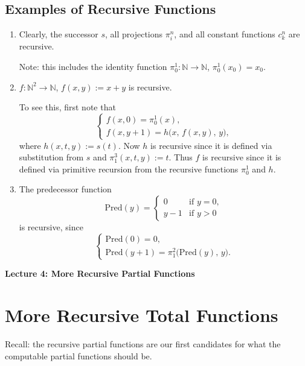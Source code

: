 \documentclass[11pt]{article}
\begin{document}
\subsection{Examples of Recursive Functions}

\begin{enumerate}[leftmargin=1.8em]
    \item Clearly, the successor $s$, all projections $\pi^n_i$, and all constant functions $c^n_k$ are recursive.

    Note: this includes the identity function $\pi^1_0\colon \mathbb{N} \to \mathbb{N}$, $\pi^1_0(x_0) = x_0$.

    \item $f\colon \mathbb{N}^2 \to \mathbb{N}$, $f(x,y) := x + y$ is recursive.

    To see this, first note that
    \[
        \begin{cases} f(x, 0) = \pi^1_0(x), \\ f(x, y+1) = h\bigl(x,\, f(x,y),\, y\bigr), \end{cases}
    \]
    where $h(x, t, y) := s(t)$. Now $h$ is recursive since it is defined via substitution from $s$ and $\pi^3_1(x, t, y) := t$. Thus $f$ is recursive since it is defined via primitive recursion from the recursive functions $\pi^1_0$ and $h$.

    \item The predecessor function
    \[
        \mathrm{Pred}(y) = \begin{cases} 0 & \text{if } y = 0, \\ y - 1 & \text{if } y > 0 \end{cases}
    \]
    is recursive, since
    \[
        \begin{cases} \mathrm{Pred}(0) = 0, \\ \mathrm{Pred}(y+1) = \pi^2_1\bigl(\mathrm{Pred}(y),\, y\bigr). \end{cases}
    \]
\end{enumerate}

\newpage

{\LARGE\bfseries Lecture 4: More Recursive Partial Functions}

\section{More Recursive Total Functions}

Recall: the recursive partial functions are our first candidates for what the computable partial functions should be.
\end{document}
